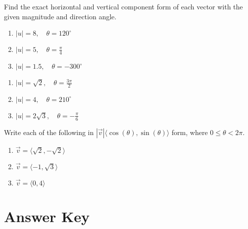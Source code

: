 Find the exact horizontal and vertical component form of each vector with the given magnitude and direction angle.
\begin{multicols}{3}
\begin{enumerate}	\setcounter{enumi}{\value{Review}}
	\item $|u| = 8, \quad \theta = 120^\circ$
	\item $|u| = 5, \quad \theta = \frac{\pi}{4}$
	\item $|u| = 1.5, \quad \theta = -300^\circ$
\end{enumerate}	\setcounter{Review}{\value{enumi}}
\end{multicols}
\begin{multicols}{3}
\begin{enumerate}		\setcounter{enumi}{\value{Review}}
	\item $|u| = \sqrt{2}, \quad \theta = \frac{3\pi}{2}$
	\item $|u| = 4, \quad \theta = 210^\circ$
	\item $|u| = 2\sqrt{3}, \quad \theta = -\frac{\pi}{6}$
\end{enumerate}	\setcounter{Review}{\value{enumi}}
\end{multicols}
\bigskip

Write each of the following in $|\vec{v}|\langle \cos(\theta), \sin(\theta)\rangle$ form, where $0 \leq \theta < 2\pi$.
\begin{multicols}{3}
\begin{enumerate}	\setcounter{enumi}{\value{Review}}
	\item $\vec{v} = \langle \sqrt{2}, -\sqrt{2} \rangle$
	\item $\vec{v} = \langle -1, \sqrt{3} \rangle$
	\item $\vec{v} = \langle 0, 4 \rangle$
\end{enumerate}	\setcounter{Review}{\value{enumi}}
\end{multicols}

\newpage

\section{Answer Key}

